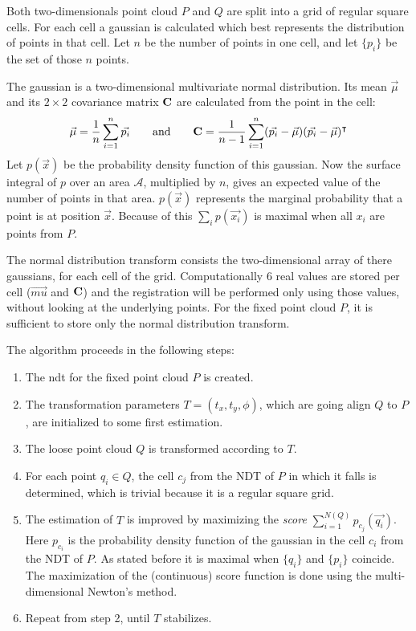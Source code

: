 Both two-dimensionals point cloud $P$ and $Q$ are split into a grid of regular square cells. For each cell a gaussian is calculated which best represents the distribution of points in that cell. Let $n$ be the number of points in one cell, and let $\{ p_i \}$ be the set of those $n$ points.

The gaussian is a two-dimensional multivariate normal distribution. Its mean $\vec{\mu}$ and its $2 \times 2$ covariance matrix $\mathbf{C}$ are calculated from the point in the cell:
\begin{equation}
\vec{\mu} = \frac{1}{n} \sum_{i=1}^{n} \vec{p_i}
\hspace{7mm} \text{and} \hspace{7mm}
\mathbf{C} = \frac{1}{n - 1} \sum_{i=1}^{n} (\vec{p_i} - \vec{\mu}) (\vec{p_i} - \vec{\mu})^\intercal
\end{equation}
Let $p(\vec{x})$ be the probability density function of this gaussian. Now the surface integral of $p$ over an area $\mathcal{A}$, multiplied by $n$, gives an expected value of the number of points in that area. $p(\vec{x})$ represents the marginal probability that a point is at position $\vec{x}$. Because of this $\sum_i p(\vec{x_i})$ is maximal when all $x_i$ are points from $P$.

The normal distribution transform consists the two-dimensional array of there gaussians, for each cell of the grid. Computationally $6$ real values are stored per cell ($\vec{mu}$ and $\mathbf{C}$) and the registration will be performed only using those values, without looking at the underlying points. For the fixed point cloud $P$, it is sufficient to store only the normal distribution transform.

The algorithm proceeds in the following steps:
\begin{enumerate}
\item The \gls{ndt} for the fixed point cloud $P$ is created.
\item The transformation parameters $T = (t_x, t_y, \phi)$, which are going align $Q$ to $P$, are initialized to some first estimation.
\item The loose point cloud $Q$ is transformed according to $T$.
\item For each point $q_i \in Q$, the cell $c_j$ from the NDT of $P$ in which it falls is determined, which is trivial because it is a regular square grid.
\item The estimation of $T$ is improved by maximizing the \emph{score} $\sum_{i=1}^{N(Q)} p_{c_j}(\vec{q_i})$. Here $p_{c_i}$ is the probability density function of the gaussian in the cell $c_i$ from the NDT of $P$. As stated before it is maximal when $\{ q_i \}$ and $\{ p_i \}$ coincide. The maximization of the (continuous) score function is done using the multi-dimensional Newton's method.
\item Repeat from step 2, until $T$ stabilizes.
\end{enumerate}

